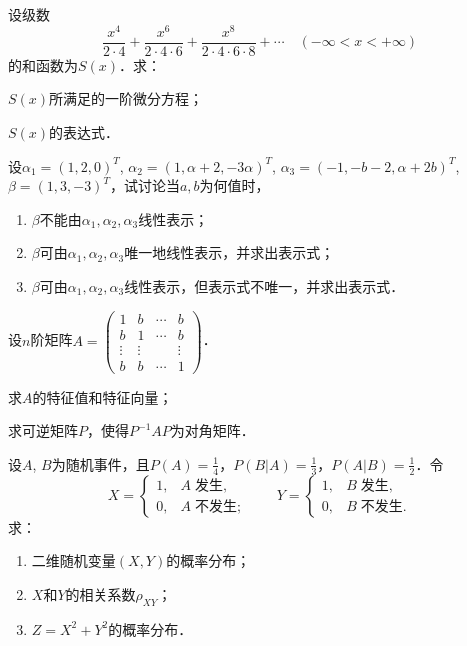 \documentclass[plain,noanswer,medmath]{../../template/jnuexam}
\begin{document}
\begin{problem}[points=9]
设级数
$$\frac{x^4}{2 \cdot 4} + \frac{x^6}{2 \cdot 4 \cdot 6} + \frac{x^8}{2 \cdot 4 \cdot 6 \cdot 8} + \cdots
  \quad (-\infty < x < +\infty)$$
的和函数为$S(x)$．求：\par
\begin{enumerate*}
\item $S(x)$所满足的一阶微分方程；
\item $S(x)$的表达式．
\end{enumerate*}
\end{problem}


\begin{problem}[points=13]
设$\alpha_1 = (1,2,0)^T$, $\alpha_2 = (1,\alpha + 2, - 3\alpha)^T$, 
$\alpha_3 = (- 1, - b - 2,\alpha + 2b)^T$, $\beta = (1,3, - 3)^T$，试讨论当$a,b$为何值时，
\begin{enumerate}
\item $\beta$不能由$\alpha_1,\alpha_2,\alpha_3$线性表示；
\item $\beta$可由$\alpha_1,\alpha_2,\alpha_3$唯一地线性表示，并求出表示式；
\item $\beta$可由$\alpha_1,\alpha_2,\alpha_3$线性表示，但表示式不唯一，并求出表示式．
\end{enumerate}
\end{problem}


\begin{problem}[points=13]
设$n$阶矩阵$A = \begin{pmatrix}
       1 &      b & \cdots & b \\
       b &      1 & \cdots & b \\
  \vdots & \vdots &        & \vdots \\
       b &      b & \cdots & 1
\end{pmatrix}$．\par
\begin{enumerate*}
\item 求$A$的特征值和特征向量；
\item 求可逆矩阵$P$，使得$P^{-1} AP$为对角矩阵．
\end{enumerate*}
\end{problem}


\begin{problem}[points=13]%
设$A$, $B$为随机事件，且$P(A) = \frac{1}{4}$，$P(B|A) = \frac{1}{3}$，$P(A|B) = \frac{1}{2}$．令
$$X = \begin{cases}
  1, & A\;\text{发生}, \\
  0, & A\;\text{不发生};
\end{cases} \qquad Y = \begin{cases}
  1, & B\;\text{发生}, \\
  0, & B\;\text{不发生}.
\end{cases}$$
求：
\begin{enumerate}
\item 二维随机变量$(X,Y)$的概率分布；
\item $X$和$Y$的相关系数$\rho_{XY}$；
\item $Z = X^2 + Y^2$的概率分布．
\end{enumerate}
\end{problem}
\end{document}

